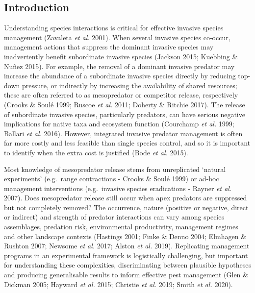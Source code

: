 \documentclass[11pt,a4paper,titlepage,twoside,openright]{style/unimelbthesis}
\begin{document}
\begin{mainmatter}
\hypertarget{introduction-2}{%
\section{Introduction}\label{introduction-2}}

Understanding species interactions is critical for effective invasive species management (Zavaleta \emph{et al.} 2001). When several invasive species co-occur, management actions that suppress the dominant invasive species may inadvertently benefit subordinate invasive species (Jackson 2015; Kuebbing \& Nuñez 2015). For example, the removal of a dominant invasive predator may increase the abundance of a subordinate invasive species directly by reducing top-down pressure, or indirectly by increasing the availability of shared resources; these are often referred to as mesopredator or competitor release, respectively (Crooks \& Soulé 1999; Ruscoe \emph{et al.} 2011; Doherty \& Ritchie 2017). The release of subordinate invasive species, particularly predators, can have serious negative implications for native taxa and ecosystem function (Courchamp \emph{et al.} 1999; Ballari \emph{et al.} 2016). However, integrated invasive predator management is often far more costly and less feasible than single species control, and so it is important to identify when the extra cost is justified (Bode \emph{et al.} 2015).

Most knowledge of mesopredator release stems from unreplicated `natural experiments' (e.g.~range contractions - Crooks \& Soulé 1999) or ad-hoc management interventions (e.g.~invasive species eradications - Rayner \emph{et al.} 2007). Does mesopredator release still occur when apex predators are suppressed but not completely removed? The occurrence, nature (positive or negative, direct or indirect) and strength of predator interactions can vary among species assemblages, predation risk, environmental productivity, management regimes and other landscape contexts (Hastings 2001; Finke \& Denno 2004; Elmhagen \& Rushton 2007; Newsome \emph{et al.} 2017; Alston \emph{et al.} 2019). Replicating management programs in an experimental framework is logistically challenging, but important for understanding these complexities, discriminating between plausible hypotheses and producing generalisable results to inform effective pest management (Glen \& Dickman 2005; Hayward \emph{et al.} 2015; Christie \emph{et al.} 2019; Smith \emph{et al.} 2020).


\end{mainmatter}
\end{document}
